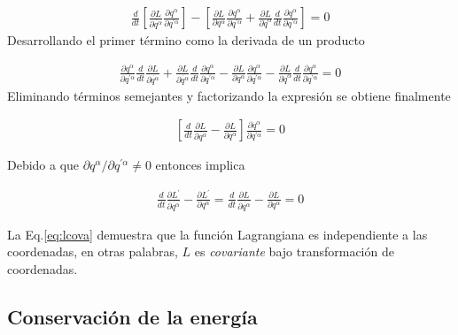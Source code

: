 \begin{gather*}
    \frac{d}{dt}\left[\frac{\partial L}{\partial \dot{q^{\alpha}}}\frac{\partial q^{\alpha}}{\partial q^{\prime\alpha}}\right] - \left[\frac{\partial L}{\partial q^{\alpha}}\frac{\partial q^{\alpha}}{\partial q^{\prime\alpha}} + \frac{\partial L}{\partial \dot{q}^{\alpha}}\frac{d}{dt}\frac{\partial q^{\alpha}}{\partial q^{\prime\alpha}}\right] = 0
\end{gather*}
Desarrollando el primer término como la derivada de un producto

\begin{gather*}
    \frac{\partial q^{\alpha}}{\partial q^{\prime\alpha}}\frac{d}{dt}\frac{\partial L}{\partial \dot{q^{\alpha}}} + \frac{\partial L}{\partial \dot{q^{\alpha}}}\frac{d}{dt}\frac{\partial q^{\alpha}}{\partial q^{\prime\alpha}} - \frac{\partial L}{\partial q^{\alpha}}\frac{\partial q^{\alpha}}{\partial q^{\prime\alpha}} - \frac{\partial L}{\partial \dot{q}^{\alpha}}\frac{d}{dt}\frac{\partial q^{\alpha}}{\partial q^{\prime\alpha}} = 0
\end{gather*}
Eliminando términos semejantes y factorizando la expresión se obtiene finalmente 

\begin{gather*}
    \left[\frac{d}{dt}\frac{\partial L}{\partial \dot{q^{\alpha}}} - \frac{\partial L}{\partial q^{\alpha}}\right]\frac{\partial q^{\alpha}}{\partial q^{\prime\alpha}} = 0
\end{gather*}

Debido a que $\partial q^{\alpha} /\partial q^{\prime\alpha} \neq 0$ entonces implica

\begin{gather}
    \label{eq:lcova}\frac{d}{dt}\frac{\partial L^{\prime}}{\partial \dot{q^{\alpha}}} - \frac{\partial L^{\prime}}{\partial q^{\alpha}} = \frac{d}{dt}\frac{\partial L}{\partial \dot{q^{\alpha}}} - \frac{\partial L}{\partial q^{\alpha}} = 0
\end{gather}

La Eq.\ref*{eq:lcova} demuestra que la función Lagrangiana es independiente a las coordenadas, en otras palabras, $L$ es \textit{covariante} bajo transformación de coordenadas.

\subsection[short]{Conservación de la energía}

